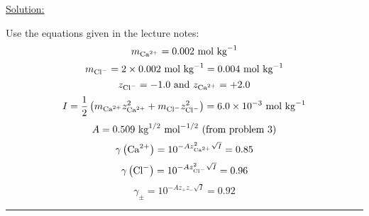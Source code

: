 \noindent
\underline{Solution:}

Use the equations given in the lecture notes:
$$m_{\textnormal{Ca}^{2+}} = 0.002\textnormal{ mol kg}^{-1}$$
$$m_{\textnormal{Cl}^-} = 2\times 0.002\textnormal{ mol kg}^{-1} = 0.004\textnormal{ mol kg}^{-1}$$
$$z_{\textnormal{Cl}^{-}} = -1.0\textnormal{ and }z_{\textnormal{Ca}^{2+}} = +2.0$$
$$I = \frac{1}{2}\left(m_{\textnormal{Ca}^{2+}}z_{\textnormal{Ca}^{2+}}^2 + m_{\textnormal{Cl}^-}z_{\textnormal{Cl}^-}^{2}\right) = 6.0\times 10^{-3}\textnormal{ mol kg}^{-1}$$
$$A = 0.509\textnormal{ kg}^{1/2}\textnormal{ mol}^{-1/2}\textnormal{ (from problem 3)}$$
$$\gamma\left(\textnormal{Ca}^{2+}\right) = 10^{-Az_{\textnormal{Ca}^{2+}}^2\sqrt{I}} = 0.85$$
$$\gamma\left(\textnormal{Cl}^-\right) = 10^{-Az_{\textnormal{Cl}^{-}}^2\sqrt{I}} = 0.96$$
$$\gamma_\pm = 10^{-Az_+z_-\sqrt{I}} = 0.92$$

\hrule\vspace{0.5cm}
